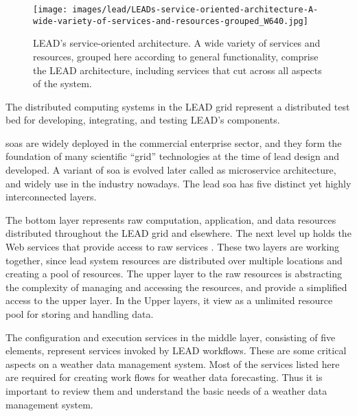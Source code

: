 \documentclass[a4paper,oneside,12pt]{report}
\begin{document}
\begin{figure}[htp]
    \centering
    \texttt{[image: images/lead/LEADs-service-oriented-architecture-A-wide-variety-of-services-and-resources-grouped\_W640.jpg]}\\
    \caption{LEAD's service-oriented architecture. A wide variety of services and resources, grouped here according to general functionality, comprise the LEAD architecture, including services that cut across all aspects of the system. \cite{Droegemeier2005Service-OrientedWeather} }
    \label{fi:lead_soa}
\end{figure}

The distributed computing systems in the LEAD grid represent a distributed test bed for developing, integrating, and testing LEAD's components.

\acrshort{soa}s are widely deployed in the commercial enterprise sector, and they form the foundation of many scientific “grid” technologies at the time of \acrshort{lead} design and developed. A variant of \acrshort{soa} is evolved later called as microservice architecture, and widely use in the industry nowadays. The \acrshort{lead} \acrshort{soa} has five distinct yet highly interconnected layers. 

The bottom layer represents raw computation, application, and data resources distributed throughout the LEAD grid and elsewhere. The next level up holds the Web services that provide access to raw services \cite{Droegemeier2005Service-OrientedWeather}. These two layers are working together, since \acrshort{lead} system resources are distributed over multiple locations and creating a pool of resources. The upper layer to the raw resources is abstracting the complexity of managing and accessing the resources, and provide a simplified access to the upper layer. In the Upper layers, it view as a unlimited resource pool for storing and handling data.

The configuration and execution services in the middle layer, consisting of five elements, represent services invoked by LEAD workflows. These are some critical aspects on a weather data management system. Most of the services listed here are required for creating work flows for weather data forecasting. Thus it is important to review them and understand the basic needs of a weather data management system.
\end{document}
